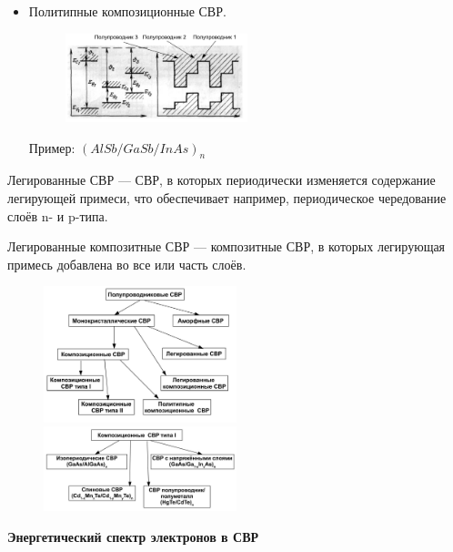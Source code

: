 \begin{itemize}
\item Политипные композиционные СВР.
    \begin{figure}[h!]
    \centering
    \includegraphics[width=0.5\textwidth]{images/ph30.3.jpg}
    \end{figure}

 Пример: $(AlSb/GaSb/InAs)_n$ 
\end{itemize}


Легированные СВР –-- СВР, в которых периодически изменяется
содержание легирующей примеси, что обеспечивает например,
периодическое чередование слоёв n- и p-типа.

Легированные композитные СВР --– композитные СВР, в которых
легирующая примесь добавлена во все или часть слоёв.

\begin{figure}[h!]
    \includegraphics[width=0.5\textwidth]{images/ph30.4.jpg}
 \includegraphics[width=0.5\textwidth]{images/ph30.5.jpg}
\end{figure}


\textbf{Энергетический спектр электронов в СВР}

